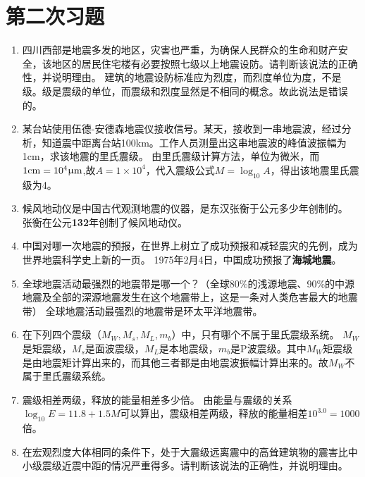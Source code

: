 \documentclass[twoside,titlepage,hyperref,UTF8,12pt]{ctexart}
\begin{document}
\newpage
\section{第二次习题}
\begin{enumerate}
    \item 四川西部是地震多发的地区，灾害也严重，为确保人民群众的生命和财产安全，该地区的居民住宅楼有必要按照七级以上地震设防。请判断该说法的正确性，并说明理由。\newline
    {\kaishu{}建筑的地震设防标准应为烈度，而烈度单位为度，不是级。级是震级的单位，而震级和烈度显然是不相同的概念。故此说法是错误的。}
    \item 某台站使用伍德-安德森地震仪接收信号。某天，接收到一串地震波，经过分析，知道震中距离台站100km。工作人员测量出这串地震波的峰值波振幅为1cm，求该地震的里氏震级。\newline
    {\kaishu{}由里氏震级计算方法，单位为微米，而$1\rm{cm} = 10^4 \upmu\rm{m}$,故$A = 1\times10^4$，代入震级公式$M = \log_{10}A$，得出该地震里氏震级为4。}
    \item 候风地动仪是中国古代观测地震的仪器，是东汉张衡于公元多少年创制的。\newline
    {\kaishu{}张衡在公元\textbf{132}年创制了候风地动仪。}
    \item 中国对哪一次地震的预报，在世界上树立了成功预报和减轻震灾的先例，成为世界地震科学史上新的一页。\newline
    {\kaishu{}1975年2月4日，中国成功预报了\textbf{海城地震}。}
    \item 全球地震活动最强烈的地震带是哪一个？（全球80\%的浅源地震、90\%的中源地震及全部的深源地震发生在这个地震带上，这是一条对人类危害最大的地震带）\newline
    {\kaishu{}全球地震活动最强烈的地震带是{\heiti{}环太平洋地震带。}}
    \item 在下列四个震级（$M_W,M_s,M_L,m_b$）中，只有哪个不属于里氏震级系统。\newline
    {\kaishu{}$M_W$是矩震级，$M_s$是面波震级，$M_L$是本地震级，$m_b$是P波震级。其中$M_W$矩震级是由地震矩计算出来的，而其他三者都是由地震波振幅计算出来的。故$M_W$不属于里氏震级系统。}
    \item 震级相差两级，释放的能量相差多少倍。\newline
    {\kaishu{}由能量与震级的关系$\log_{10}E = 11.8 + 1.5M$可以算出，震级相差两级，释放的能量相差$10^{3.0} = 1000$倍。}
    \item 在宏观烈度大体相同的条件下，处于大震级远离震中的高耸建筑物的震害比中小级震级近震中距的情况严重得多。请判断该说法的正确性，并说明理由。\newline

\end{enumerate}
\end{document}
